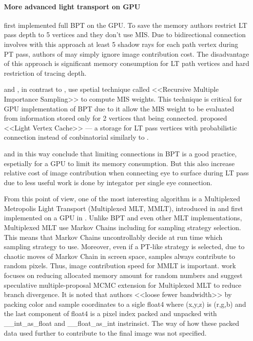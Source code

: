 \documentclass[twoside,twocolumn,10pt]{article}
\begin{document}
\paragraph{More advanced light transport on GPU}

\cite{BPTGPU} first implemented full BPT on the GPU. To save the memory authors restrict LT pass depth to 5 vertices and they don't use MIS. Due to bidirectional connection involves with this approach at least 5 shadow rays for each path vertex during PT pass, authors of \cite{BPTGPU} may simply ignore image contribution cost. The disadvantage of this approach is significant memory consumption for LT path vertices and hard restriction of tracing depth. 

\cite{Antwerpen11} and \cite{VCMGPU}, in contrast to \cite{BPTGPU}, use spetial technique called <<Recursive Multiple Importance Sampling>> \cite{Antwerpen11, Georgiev12} to compute MIS weights. This technique is critical for GPU implementation of BPT due to it allow the MIS weight to be evaluated from information stored only for 2 vertices that being connected. \cite{VCMGPU} proposed <<Light Vertex Cache>> --- a storage for LT pass vertices with probabilistic connection instead of conbinatorial similarly to \cite{PCBPT}. 

\cite{Bogolepov13,VCMGPU} and \cite{PCBPT} in this way conclude that limiting connections in BPT is a good practice, espetially for a GPU to limit its memory consumption. But this also increase relative cost of image contribution when connecting eye to surface during LT pass due to less useful work is done by integator per single eye connection.

From this point of view, one of the most interesting algorithm is a Multiplexed Metropolis Light Transport (Multiplexed MLT, MMLT), introduced in \cite{Hachisuka14} and first implemented on a GPU in \cite{MMLTGPU}. Unlike BPT and even other MLT implementations, Multiplexed MLT use Markov Chains including for sampling strategy selection. This means that Markov Chains uncontrollably decide at run time which sampling strategy to use. Moreover, even if a PT-like strategy is selected, due to chaotic moves of Markov Chain in screen space, samples always contribute to random pixels. Thus, image contribution speed for MMLT is important. \cite{MMLTGPU} work focuses on reducing allocated memory amount for random numbers and suggest speculative multiple-proposal MCMC extension for Multiplexed MLT to reduce branch divergence. It is noted that authors <<loose fewer bandwidth>> by packing color and sample coordinates to a sigle float4 where (x,y,z) is (r,g,b) and the last component of float4 is a pixel index packed and unpacked with \_\_int\_as\_float and \_\_float\_as\_int instrinsict. The way of how these packed data used further to contribute to the final image was not specified.
\end{document}
